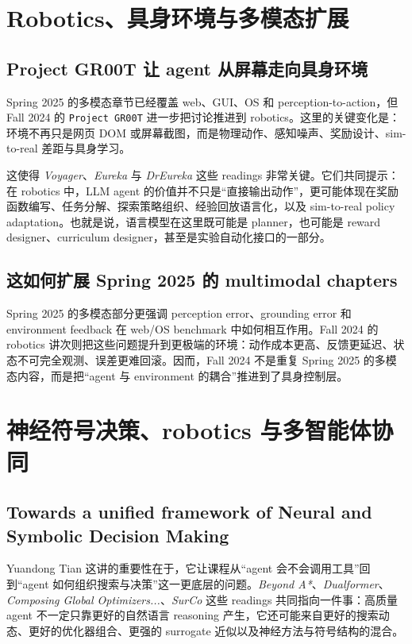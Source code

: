\section{Robotics、具身环境与多模态扩展}

\subsection{Project GR00T 让 agent 从屏幕走向具身环境}

Spring 2025 的多模态章节已经覆盖 web、GUI、OS 和 perception-to-action，但 Fall 2024 的 \texttt{Project GR00T} 进一步把讨论推进到 robotics。这里的关键变化是：环境不再只是网页 DOM 或屏幕截图，而是物理动作、感知噪声、奖励设计、sim-to-real 差距与具身学习。

这使得 \textit{Voyager}、\textit{Eureka} 与 \textit{DrEureka} 这些 readings 非常关键。它们共同提示：在 robotics 中，LLM agent 的价值并不只是“直接输出动作”，更可能体现在奖励函数编写、任务分解、探索策略组织、经验回放语言化，以及 sim-to-real policy adaptation。也就是说，语言模型在这里既可能是 planner，也可能是 reward designer、curriculum designer，甚至是实验自动化接口的一部分。

\subsection{这如何扩展 Spring 2025 的 multimodal chapters}

Spring 2025 的多模态部分更强调 perception error、grounding error 和 environment feedback 在 web/OS benchmark 中如何相互作用。Fall 2024 的 robotics 讲次则把这些问题提升到更极端的环境：动作成本更高、反馈更延迟、状态不可完全观测、误差更难回滚。因而，Fall 2024 不是重复 Spring 2025 的多模态内容，而是把“agent 与 environment 的耦合”推进到了具身控制层。

\section{神经符号决策、robotics 与多智能体协同}

\subsection{Towards a unified framework of Neural and Symbolic Decision Making}

Yuandong Tian 这讲的重要性在于，它让课程从“agent 会不会调用工具”回到“agent 如何组织搜索与决策”这一更底层的问题。\textit{Beyond A*}、\textit{Dualformer}、\textit{Composing Global Optimizers...}、\textit{SurCo} 这些 readings 共同指向一件事：高质量 agent 不一定只靠更好的自然语言 reasoning 产生，它还可能来自更好的搜索动态、更好的优化器组合、更强的 surrogate 近似以及神经方法与符号结构的混合。

